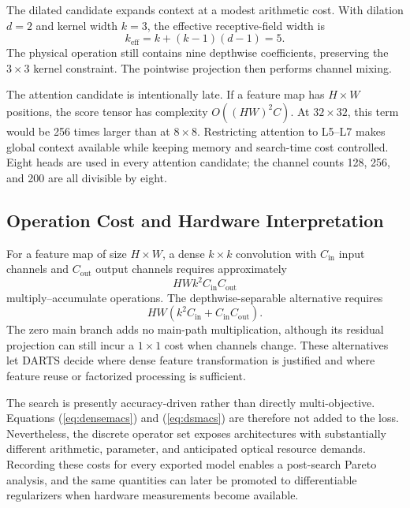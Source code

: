 \documentclass[lettersize,journal]{IEEEtran}
\begin{document}
The dilated candidate expands context at a modest arithmetic cost. With dilation $d=2$ and kernel width $k=3$, the effective receptive-field width is
\begin{equation}
k_{\mathrm{eff}}=k+(k-1)(d-1)=5.
\end{equation}
The physical operation still contains nine depthwise coefficients, preserving the $3\times3$ kernel constraint. The pointwise projection then performs channel mixing.

The attention candidate is intentionally late. If a feature map has $H\times W$ positions, the score tensor has complexity $O((HW)^2C)$. At $32\times32$, this term would be 256 times larger than at $8\times8$. Restricting attention to L5--L7 makes global context available while keeping memory and search-time cost controlled. Eight heads are used in every attention candidate; the channel counts 128, 256, and 200 are all divisible by eight.

\subsection{Operation Cost and Hardware Interpretation}
For a feature map of size $H\times W$, a dense $k\times k$ convolution with $C_{\mathrm{in}}$ input channels and $C_{\mathrm{out}}$ output channels requires approximately
\begin{equation}
HWk^2C_{\mathrm{in}}C_{\mathrm{out}}
\label{eq:densemacs}
\end{equation}
multiply--accumulate operations. The depthwise-separable alternative requires
\begin{equation}
HW\left(k^2C_{\mathrm{in}}+C_{\mathrm{in}}C_{\mathrm{out}}\right).
\label{eq:dsmacs}
\end{equation}
The zero main branch adds no main-path multiplication, although its residual projection can still incur a $1\times1$ cost when channels change. These alternatives let DARTS decide where dense feature transformation is justified and where feature reuse or factorized processing is sufficient.

The search is presently accuracy-driven rather than directly multi-objective. Equations (\ref{eq:densemacs}) and (\ref{eq:dsmacs}) are therefore not added to the loss. Nevertheless, the discrete operator set exposes architectures with substantially different arithmetic, parameter, and anticipated optical resource demands. Recording these costs for every exported model enables a post-search Pareto analysis, and the same quantities can later be promoted to differentiable regularizers when hardware measurements become available.
\end{document}
